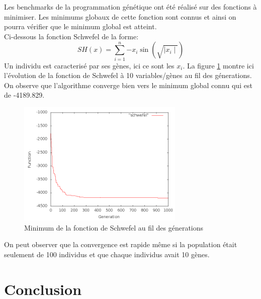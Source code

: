 \documentclass{report}
\begin{document}
Les benchmarks de la programmation génétique ont été réalisé sur des
fonctions à minimiser. Les minimums globaux de cette fonction sont
connus et ainsi on pourra vérifier que le minimum global est
atteint.\\ Ci-dessous la fonction Schwefel de la forme:
$$SH(x) = \sum_{i=1}^{n}{-x_i\sin{(\sqrt{\mid{}x_i\mid{}})}}$$ Un
individu est caracterisé par ses gènes, ici ce sont les $x_i$.  La
figure \ref{geneticschwefel} montre ici l'évolution de la fonction de
Schwefel à 10 variables/gènes au fil des génerations. On observe que
l'algorithme converge bien vers le minimum global connu qui est de
-4189.829.
\begin{figure}[H]
  \centering
  \includegraphics[width=300px]{genetic_schwefel.png}
  \caption{Minimum de la fonction de Schwefel au fil des génerations}
  \label{geneticschwefel}
\end{figure}

On peut observer que la convergence est rapide même si la population
était seulement de 100 individus et que chaque individus avait 10
gènes.

\chapter{Conclusion}
\end{document}
